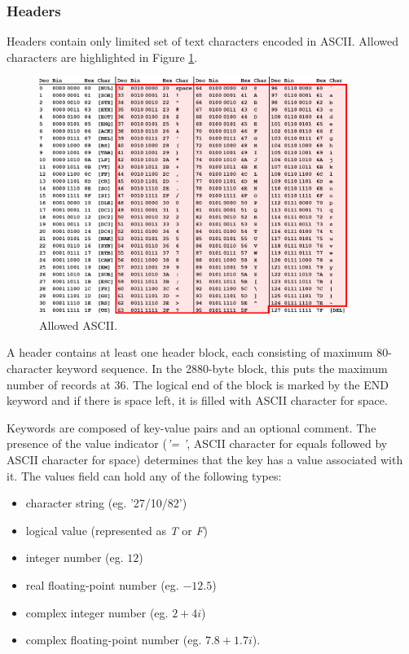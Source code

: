 \subsubsection{Headers}

	Headers contain only limited set of text characters encoded in ASCII. Allowed characters are highlighted in Figure \ref{fig:allowed_ascii}.
	
	\begin{figure}[H]
	\centering
	  \includegraphics[width=10cm]{images/asciifull}
		  \caption{Allowed ASCII.}
	  \label{fig:allowed_ascii}
	\end{figure}
	
	A header contains at least one header block, each consisting of maximum 80-character keyword sequence. In the 2880-byte block, this puts the maximum number of records at 36. The logical end of the block is marked by the END keyword and if there is space left, it is filled with ASCII character for space.
	
	Keywords are composed of key-value pairs and an optional comment. The presence of the value indicator (\emph{'= '}, ASCII character for equals followed by ASCII character for space) determines that the key has a value associated with it. The values field can hold any of the following types:
	
	\begin{itemize}
		\item character string (eg. '27/10/82')
		\item logical value (represented as \emph{T} or \emph{F})
		\item integer number (eg. $12$)
		\item real floating-point number (eg. $-12.5$)
		\item complex integer number (eg. $2+4i$)
		\item complex floating-point number (eg. $7.8+1.7i$).
	\end{itemize}
	
